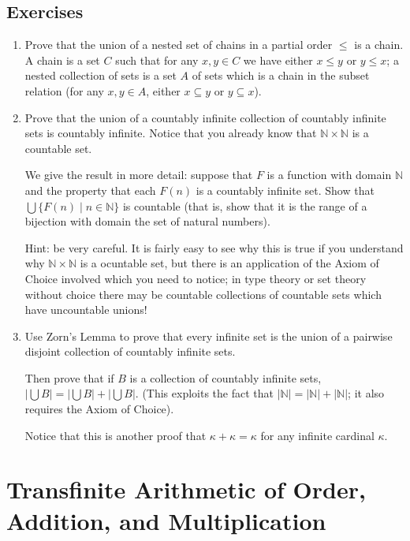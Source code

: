 \documentclass[12pt]{book}
\begin{document}
\newpage

\subsection{Exercises}

\begin{enumerate}

\item
Prove that the union of a nested set of chains in a partial order
$\leq$ is a chain.  A chain is a set $C$ such that for any $x,y \in C$
we have either $x \leq y$ or $y \leq x$; a nested collection of sets
is a set $A$ of sets which is a chain in the subset relation (for any
$x,y \in A$, either $x \subseteq y$ or $y \subseteq x$).
\item  
Prove that the union of a countably infinite collection of countably
infinite sets is countably infinite.  Notice that you already know that
${\mathbb N}\times {\mathbb N}$ is a countable set.

We give the result in more detail: suppose that $F$ is a function with
domain $\mathbb N$ and the property that each $F(n)$ is a countably
infinite set.  Show that $\bigcup \{F(n)\mid n \in {\mathbb N}\}$ is
countable (that is, show that it is the range of a bijection with
domain the set of natural numbers).

Hint: be very careful.  It is fairly easy to see why this is true if
you understand why ${\mathbb N}\times {\mathbb N}$ is a ocuntable set,
but there is an application of the Axiom of Choice involved which you
need to notice; in type theory or set theory without choice there may
be countable collections of countable sets which have uncountable
unions!


\item
Use Zorn's Lemma to prove that every infinite set is the union of a
pairwise disjoint collection of countably infinite sets.

Then prove that if $B$ is a collection of countably infinite sets,
$|\bigcup B| = |\bigcup B|+|\bigcup B|$.  (This exploits the fact that
$|{\mathbb N}|=|{\mathbb N}|+|{\mathbb N}|$; it also requires the
Axiom of Choice).

Notice that this is another proof that $\kappa+\kappa=\kappa$ for any
infinite cardinal $\kappa$.

\end{enumerate}

\newpage

\section{Transfinite Arithmetic of Order, Addition, and Multiplication}
\end{document}

